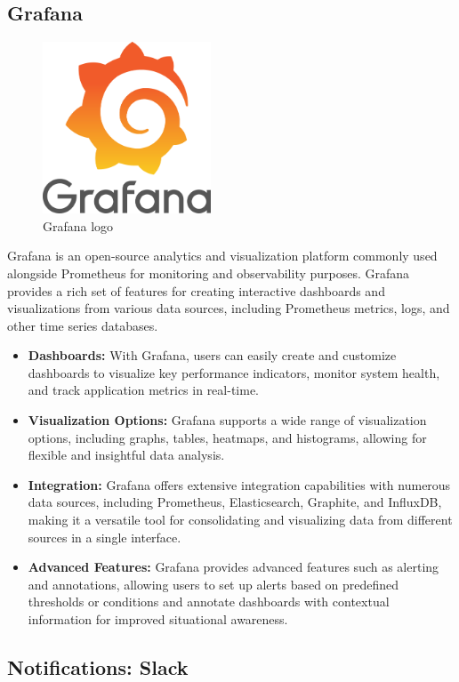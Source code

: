 \subsection*{Grafana}

  
\begin{figure}[H]
  \centering
  \includegraphics[width=5cm]{Logos/grafana-logo.png}
  \caption[]{Grafana logo}
\end{figure}
Grafana is an open-source analytics and visualization platform commonly used alongside Prometheus for monitoring and observability purposes.
Grafana provides a rich set of features for creating interactive dashboards and visualizations from various data sources, including Prometheus metrics, logs, and other time series databases.

\begin{itemize}
  \item \textbf{Dashboards:} With Grafana, users can easily create and customize dashboards to visualize key performance indicators, monitor system health, and track application metrics in real-time.
  \item \textbf{Visualization Options:} Grafana supports a wide range of visualization options, including graphs, tables, heatmaps, and histograms, allowing for flexible and insightful data analysis.
  \item \textbf{Integration:} Grafana offers extensive integration capabilities with numerous data sources, including Prometheus, Elasticsearch, Graphite, and InfluxDB, making it a versatile tool for consolidating and visualizing data from different sources in a single interface.
  \item \textbf{Advanced Features:} Grafana provides advanced features such as alerting and annotations, allowing users to set up alerts based on predefined thresholds or conditions and annotate dashboards with contextual information for improved situational awareness.
\end{itemize}

\subsection{Notifications: Slack}

